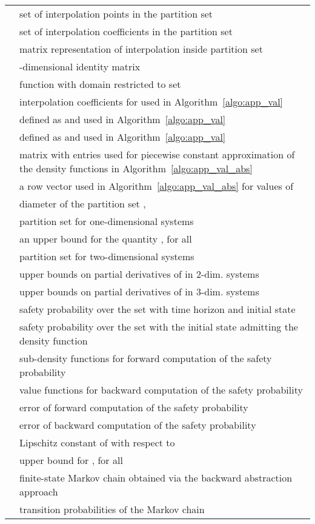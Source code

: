 \documentclass{LMCS}
\begin{document}
\begin{longtable}{lp{10.5cm}}
 & set of interpolation points in the partition set \\
 & set of interpolation coefficients in the partition set \\
& matrix representation of interpolation inside partition set \\
& -dimensional identity matrix\\
& function  with domain restricted to set \\
 & interpolation coefficients for  used in Algorithm~\ref{algo:app_val}\\
 & defined as  and used in Algorithm~\ref{algo:app_val}\\
 & defined as  and used in Algorithm~\ref{algo:app_val}\\
 & matrix with entries  used for piecewise constant approximation of the density functions in Algorithm~\ref{algo:app_val_abs}\\
& a row vector used in Algorithm~\ref{algo:app_val_abs} for values of  \\
& diameter of the partition set , \\
& partition set  for one-dimensional systems\\
& an upper bound for the quantity , for all \\
& partition set  for two-dimensional systems \\
& upper bounds on partial derivatives of  in 2-dim. systems\\
&  upper bounds on partial derivatives of  in 3-dim. systems\\
 & safety probability over the set  with time horizon  and initial state \\
 & safety probability over the set  with the initial state admitting the density function \\
 & sub-density functions for forward computation of the safety probability\\
 & value functions for backward computation of the safety probability\\
 & error of forward computation of the safety probability\\
 & error of backward computation of the safety probability\\
 & Lipschitz constant of  with respect to \\
 & upper bound for , for all \\
 & finite-state Markov chain obtained via the backward abstraction approach\\
 & transition probabilities of the Markov chain 
\end{longtable}
\end{document}
